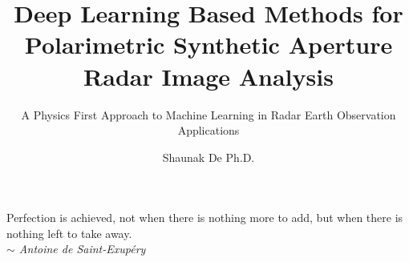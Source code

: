 \documentclass[fontsize=14pt,a4paper,DIV=9,twoside,chapterprefix=on,final]{scrbook}
\begin{document}
\title{Deep Learning Based Methods for Polarimetric Synthetic Aperture Radar Image Analysis}
\subtitle{A Physics First Approach to Machine Learning in Radar Earth Observation Applications}
\author{Shaunak De \small{Ph.D.}}
\date{}
\publishers{2018}

\dedication{ \small{To love, perseverance and hope,\\ and you my dearest cantaloupe. } }
\maketitle  

 


\begin{titlepage}


\vspace*{\fill}\small{
Perfection is achieved, not when there is nothing more to add, but when there is nothing left to take away.\\
\hfill \textit{$\sim$ Antoine de Saint-Exup\'ery}}
\vspace*{\fill}




\end{titlepage}

%
\end{document}
